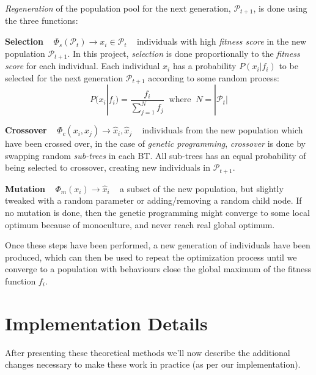 \documentclass[a4paper, twocolumn]{article}
\begin{document}
	\emph{Regeneration} of the population pool for the next generation, \(\mathcal{P}_{t+1}\), is done using the three functions:

    \vspace{1em}

    \textbf{Selection} ~ \(\Phi_s(\mathcal{P}_t) \rightarrow x_i \in \mathcal{P}_t\) ~ individuals with high \emph{fitness score} in the new population \(\mathcal{P}_{t+1}\). In this project, \emph{selection} is done proportionally to the \emph{fitness score} for each individual. Each individual \(x_i\) has a probability \(P(x_i|f_i)\) to be selected for the next generation \(\mathcal{P}_{t+1}\) according to some random process:
    \begin{equation*}
        P(x_i|f_i) = \frac{f_i}{\sum_{j = 1}^{N}f_j} \; \; \text{where} \; \; N = |\mathcal{P}_t|
    \end{equation*}

    \textbf{Crossover} ~ \(\Phi_c(x_i,x_j) \rightarrow \hat{x}_i,\hat{x}_j\) ~ individuals from the new population which have been crossed over, in the case of \emph{genetic programming}, \emph{crossover} is done by swapping random \emph{sub-trees} in each BT. All sub-trees has an equal probability of being selected to crossover, creating new individuals in \(\mathcal{P}_{t+1}\).

    \vspace{1em}

    \textbf{Mutation} ~ \(\Phi_m(x_i) \rightarrow \hat{x}_i\) ~ a subset of the new population, but slightly tweaked with a random parameter or adding/removing a random child node. If no mutation is done, then the genetic programming might converge to some local optimum because of monoculture, and never reach real global optimum.

    \vspace{1em}

    Once these steps have been performed, a new generation of individuals have been produced, which can then be used to repeat the optimization process until we converge to a population with behaviours close the global maximum of the fitness function \(f_i\).


    \section{Implementation Details} \label{sec:implementation_details}

        After presenting these theoretical methods we'll now describe the additional changes necessary to make these work in practice (as per our implementation).
\end{document}
